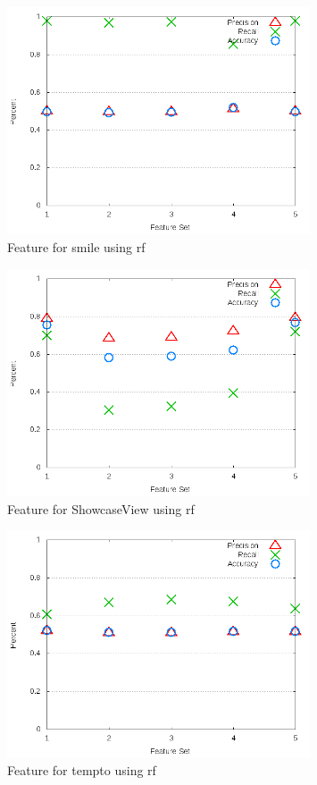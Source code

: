 \begin{figure}[!t]
\centering
\includegraphics[width=0.8\textwidth]{images/rf/test_3/smile_sample_range.png}
\caption{Feature for smile using \gls{rf}}
\label{fig:test_3_smile_rf}
\end{figure}

\begin{figure}[!t]
\centering
\includegraphics[width=0.8\textwidth]{images/rf/test_3/ShowcaseView_sample_range.png}
\caption{Feature for ShowcaseView using \gls{rf}}
\label{fig:test_3_ShowcaseView_rf}
\end{figure}

\begin{figure}[!t]
\centering
\includegraphics[width=0.8\textwidth]{images/rf/test_3/tempto_sample_range.png}
\caption{Feature for tempto using \gls{rf}}
\label{fig:test_3_tempto_rf}
\end{figure}

